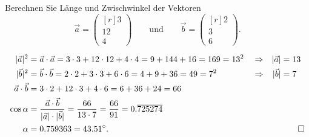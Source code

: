 Berechnen Sie Länge und Zwischwinkel der Vektoren
\[
\vec{a}
=
\begin{pmatrix*}[r] 3 \\ 12 \\ 4 \end{pmatrix*}
\qquad\text{und}\qquad
\vec{b}
=
\begin{pmatrix*}[r] 2 \\ 3 \\ 6 \end{pmatrix*}.
\]

\begin{loesung}
\begin{align*}
|\vec{a}|^2
&=
\vec{a}\cdot\vec{a}
=
3\cdot 3 + 12\cdot 12 + 4 \cdot 4
=
9 + 144 + 16
=
169
=
13^2
&&\Rightarrow&
|\vec{a}|
&=
13
\\
|\vec{b}|^2
&=
\vec{b}\cdot\vec{b}
=
2\cdot 2 + 3\cdot 3 + 6 \cdot 6
=
4 + 9 + 36
=
49
=
7^2
&&\Rightarrow&
|\vec{b}|
&=
7
\\
\vec{a}\cdot\vec{b}
&=
3\cdot 2 + 12 \cdot 3 + 4 \cdot 6
=
6 + 36 + 24
=
66
&&&&
\\
\cos\alpha
&=
\frac{\vec{a}\cdot\vec{b}}{|\vec{a}|\cdot|\vec{b}|}
=
\frac{66}{13\cdot 7}
=
\frac{66}{91}
=
0.\overline{725274}
&&&&
\\
\alpha
&=
0.759363
=
43.51^\circ.
&&&&
\qedhere
\end{align*}
\end{loesung}
